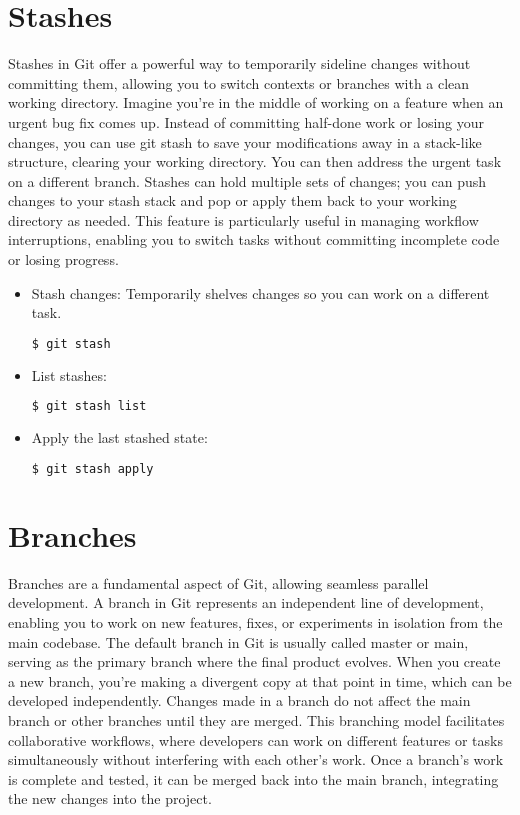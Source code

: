 \documentclass[10pt,twocolumn]{article}
\begin{document}
\section{Stashes}
Stashes in Git offer a powerful way to temporarily sideline changes without committing them, allowing you to switch contexts or branches with a clean working directory. Imagine you're in the middle of working on a feature when an urgent bug fix comes up. Instead of committing half-done work or losing your changes, you can use git stash to save your modifications away in a stack-like structure, clearing your working directory. You can then address the urgent task on a different branch. Stashes can hold multiple sets of changes; you can push changes to your stash stack and pop or apply them back to your working directory as needed. This feature is particularly useful in managing workflow interruptions, enabling you to switch tasks without committing incomplete code or losing progress.

\begin{itemize}
    \item Stash changes: Temporarily shelves changes so you can work on a different task.
    \begin{lstlisting}[language=bash]
    $ git stash
    \end{lstlisting}
    \item List stashes:
    \begin{lstlisting}[language=bash]
    $ git stash list
    \end{lstlisting}
    \item Apply the last stashed state:
    \begin{lstlisting}[language=bash]
    $ git stash apply
    \end{lstlisting}
\end{itemize}

\section{Branches}
Branches are a fundamental aspect of Git, allowing seamless parallel development. A branch in Git represents an independent line of development, enabling you to work on new features, fixes, or experiments in isolation from the main codebase. The default branch in Git is usually called master or main, serving as the primary branch where the final product evolves. When you create a new branch, you're making a divergent copy at that point in time, which can be developed independently. Changes made in a branch do not affect the main branch or other branches until they are merged. This branching model facilitates collaborative workflows, where developers can work on different features or tasks simultaneously without interfering with each other's work. Once a branch's work is complete and tested, it can be merged back into the main branch, integrating the new changes into the project.
\end{document}
